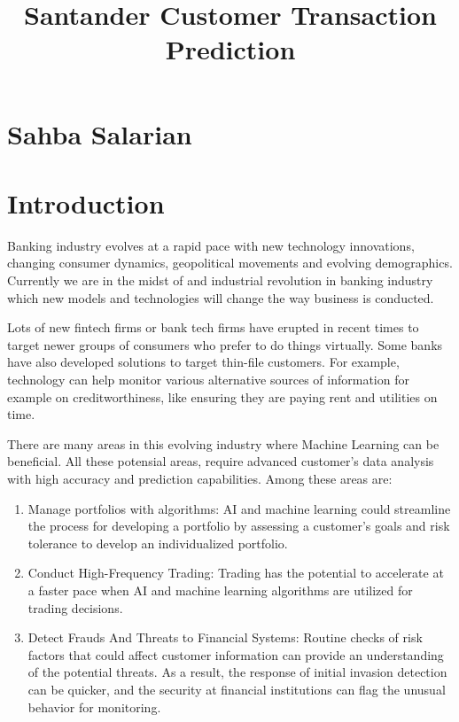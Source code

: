 \documentclass[11pt]{article}
\title{Santander Customer Transaction Prediction}
\providecommand{\tightlist}{%
      \setlength{\itemsep}{0pt}\setlength{\parskip}{0pt}}
\begin{document}
    
    
    \maketitle
    
    

    
    \hypertarget{sahba-salarian}{%
\section{Sahba Salarian}\label{sahba-salarian}}

    \hypertarget{introduction}{%
\section{Introduction}\label{introduction}}

    Banking industry evolves at a rapid pace with new technology
innovations, changing consumer dynamics, geopolitical movements and
evolving demographics. Currently we are in the midst of and industrial
revolution in banking industry which new models and technologies will
change the way business is conducted.

Lots of new fintech firms or bank tech firms have erupted in recent
times to target newer groups of consumers who prefer to do things
virtually. Some banks have also developed solutions to target thin-file
customers. For example, technology can help monitor various alternative
sources of information for example on creditworthiness, like ensuring
they are paying rent and utilities on time.

There are many areas in this evolving industry where Machine Learning
can be beneficial. All these potensial areas, require advanced
customer's data analysis with high accuracy and prediction capabilities.
Among these areas are:

\begin{enumerate}
\def\labelenumi{\arabic{enumi}.}
\tightlist
\item
  Manage portfolios with algorithms: AI and machine learning could
  streamline the process for developing a portfolio by assessing a
  customer's goals and risk tolerance to develop an individualized
  portfolio.
\item
  Conduct High-Frequency Trading: Trading has the potential to
  accelerate at a faster pace when AI and machine learning algorithms
  are utilized for trading decisions.
\item
  Detect Frauds And Threats to Financial Systems: Routine checks of risk
  factors that could affect customer information can provide an
  understanding of the potential threats. As a result, the response of
  initial invasion detection can be quicker, and the security at
  financial institutions can flag the unusual behavior for monitoring.
\end{enumerate}
\end{document}
